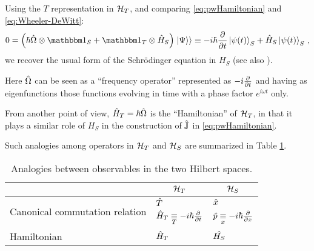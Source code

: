 Using the $T$ representation in $\hilb{H}_T$,
and comparing \eqref{eq:pwHamiltonian} and \eqref{eq:Wheeler-DeWitt}:
\begin{equation}\label{eq:schrod_from_pw}
  0 = \qty(\hbar\op{\Omega}\ox\idop_S + \idop_{T}\ox\op{H}_S)\dket{\Psi}
    \repr -i\hbar\pdv{t}\ket{\psi(t)}_{S} + \op{H}_S\ket{\psi(t)}_{S}
    \,\text{,}
\end{equation}
we recover the usual form of the Schr\"{o}dinger equation in $H_S$
(see also \cite[709--710]{Wootters:Loyola}).

Here $\op{\Omega}$ can be seen as a ``frequency operator''
represented as $-i\pdv{t}$ and having as eigenfunctions
those functions evolving in time with a phase factor $e^{i \omega t}$ only.

From another point of view, $\op{H}_{T} = \hbar\op{\Omega}$ is the ``Hamiltonian'' of $\hilb{H}_T$,
in that it plays a similar role of $H_S$ in the construction of
$\op{\mathbb{J}}$ in \eqref{eq:pwHamiltonian}.

Such analogies among operators in $\hilb{H}_T$ and $\hilb{H}_S$ are summarized in Table \ref{tbl:op_comparison_pw}.

{
  \begin{table}
    \centering
    \begin{tabular}{l|l|l}
      & \multicolumn{1}{c|}{$\hilb{H}_T$}                 & \multicolumn{1}{|c}{$\hilb{H}_S$}       \\
      \hline
      \multirow{2}{11em}{Canonical commutation relation}
      & $\op{T}$                                          & $\op{x}$                            \\
      & $\op{H}_T \repr[T] -i\hbar\pdv{t} $  & $\op{p} \repr[x] -i\hbar\pdv{x}$       \\
      \hline
      Hamiltonian
      & $\op{H}_T$                                        & $\op{H_S}$
    \end{tabular}
    {\caption{
      Analogies between observables in the two Hilbert spaces.
    }\label{tbl:op_comparison_pw}}
  \end{table}
}


